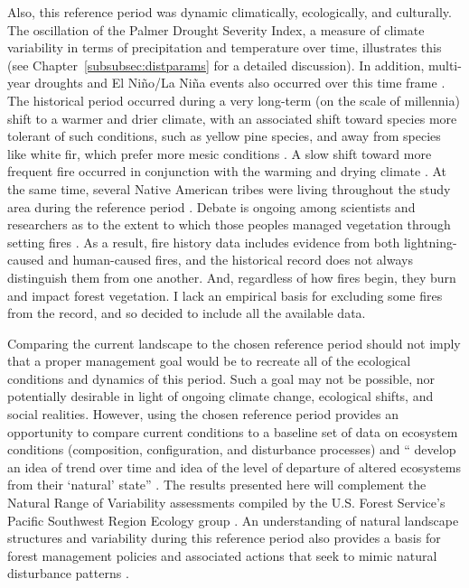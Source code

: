 Also, this reference period was dynamic climatically, ecologically, and culturally. The oscillation of the Palmer Drought Severity Index, a measure of climate variability in terms of precipitation and temperature over time, illustrates this (see Chapter~\ref{subsubsec:distparams} for a detailed discussion). In addition, multi-year droughts and El Ni\~no/La Ni\~na events also occurred over this time frame \citep{Minnich2007}. The historical period occurred during a very long-term (on the scale of millennia) shift to a warmer and drier climate, with an associated shift toward species more tolerant of such conditions, such as yellow pine species, and away from species like white fir, which prefer more mesic conditions \citep{Safford2013}. A slow shift toward more frequent fire occurred in conjunction with the warming and drying climate \citep{Safford2013}. At the same time, several Native American tribes were living throughout the study area during the reference period \citep{Anderson1996}. Debate is ongoing among scientists and researchers as to the extent to which those peoples managed vegetation through setting fires \citep{Anderson1996}. As a result, fire history data includes evidence from both lightning-caused and human-caused fires, and the historical record does not always distinguish them from one another. And, regardless of how fires begin, they burn and impact forest vegetation. I lack an empirical basis for excluding some fires from the record, and so decided to include all the available data.

Comparing the current landscape to the chosen reference period should not imply that a proper management goal would be to recreate all of the ecological conditions and dynamics of this period. Such a goal may not be possible, nor potentially desirable in light of ongoing climate change, ecological shifts, and social realities. However, using the chosen reference period provides an opportunity to compare current conditions to a baseline set of data on ecosystem conditions (composition, configuration, and disturbance processes) and `` develop an idea of trend over time and idea of the level of departure of altered ecosystems from their `natural' state'' \citep{Safford2013}. The results presented here will complement the Natural Range of Variability assessments compiled by the U.S. Forest Service's Pacific Southwest Region Ecology group \citep{Safford2013,Merriam2013,Meyer2013a,Meyer2013,Estes2013,Estes2013a,Gross2013}. An understanding of natural landscape structures and variability during this reference period also provides a basis for forest management policies and associated actions that seek to mimic natural disturbance patterns \citep{Romme2000,Buse2002}. 






